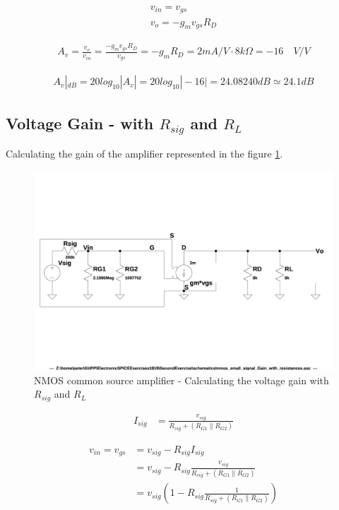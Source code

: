 \documentclass[10pt,a4paper]{book}
\begin{document}
\begin{align}
v_{in} = v_{gs}\\
v_{o} = - g_m v_{gs} R_D
\end{align}

\begin{align}
A_v = \frac{v_o}{v_{in}} = \frac{- g_m v_{gs} R_D}{v_{gs}} = - g_m R_D = 2mA/V \cdot 8k\Omega = -16 \quad V/V
\end{align}

\begin{align}
A_v|_{dB} = 20 log_{10} |A_v| = 20 log_{10} |-16| = 24.08240 dB \simeq 24.1 dB
\end{align}

\subsection{Voltage Gain - with $R_{sig}$ and $R_L$}
Calculating the gain of the amplifier represented in the figure \ref{nmos_pi_gain_with_resistances}.

\begin{figure}[h]
  \centering
  \includegraphics[width=12cm]{schematics/nmos_small_signal_with_resistances.jpg}
  \caption{NMOS common source amplifier - Calculating the voltage gain with $R_{sig}$ and $R_L$}
  \label{nmos_pi_gain_with_resistances}
\end{figure}

\begin{align}
I_{sig} &= \frac{v_{sig}}{R_{sig} + (R_{G1} \parallel R_{G2})}
\end{align}

\begin{align}
v_{in} = v_{gs} &= v_{sig} - R_{sig} I_{sig}\\
&= v_{sig} - R_{sig} \frac{v_{sig}}{R_{sig} + (R_{G1} \parallel R_{G2})}\\
&= v_{sig} \left(1 - R_{sig} \frac{1}{R_{sig} + (R_{G1} \parallel R_{G2})}\right)
\end{align}
\end{document}
